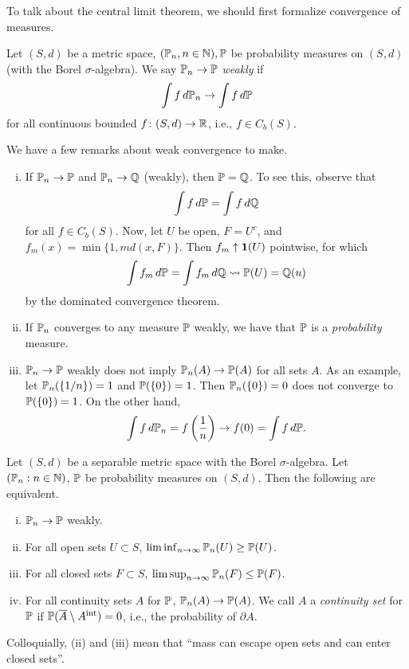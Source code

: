 To talk about the central limit theorem, we should first formalize convergence of measures.

\begin{definition} \label{defn:weak_measure_convergence}
    Let $(S, d)$ be a metric space, $(\mathbb P_n, n \in \mathbb N), \mathbb P$ be probability measures on $(S, d)$ (with the Borel $\sigma$-algebra). We say $\mathbb P_n \to \mathbb P$ \textit{weakly} if
    \[ \int f \, d \mathbb P_n \to \int f \, d\mathbb P \]
    for all continuous bounded $f \colon (S, d) \to \mathbb R$, i.e., $f \in C_b(S)$.
\end{definition}

We have a few remarks about weak convergence to make.
\begin{enumerate}[(i)]
    \item If $\mathbb P_n \to \mathbb P$ and $\mathbb P_n \to \mathbb Q$ (weakly), then $\mathbb P = \mathbb Q$. To see this, observe that
    \[ \int f \, d\mathbb P = \int f \, d\mathbb Q \]
    for all $f \in C_b(S)$. Now, let $U$ be open, $F = U^c$, and $f_m(x) = \min\{1, m d(x, F)\}$. Then $f_m \uparrow \mathbf 1(U)$ pointwise, for which
    \[ \int f_m \, d\mathbb P = \int f_m \, d\mathbb Q \leadsto \mathbb P(U) = \mathbb Q(u) \]
    by the dominated convergence theorem.

    \item If $\mathbb P_n$ converges to any measure $\mathbb P$ weakly, we have that $\mathbb P$ is a \textit{probability} measure. 
    
    \item $\mathbb P_n \to \mathbb P$ weakly does not imply $\mathbb P_n(A) \to \mathbb P(A)$ for all sets $A$. As an example, let $\mathbb P_n(\{1/n\}) = 1$ and $\mathbb P(\{0\}) = 1$. Then $\mathbb P_n(\{0\}) = 0$ does not converge to $\mathbb P(\{0\}) = 1$. On the other hand,
    \[ \int f \, d \mathbb P_n = f\left(\frac{1}{n}\right) \to f(0) = \int f \, d\mathbb P. \]
\end{enumerate}

\newpage
\begin{theorem} \label{thm:portmanteau}
    Let $(S, d)$ be a separable metric space with the Borel $\sigma$-algebra. Let $(\mathbb P_n : n \in \mathbb N)$, $\mathbb P$ be probability measures on $(S, d)$. Then the following are equivalent.
    \begin{enumerate}[(i)]
        \item $\mathbb P_n \to \mathbb P$ weakly.
        \item For all open sets $U \subset S$, $\liminf_{n \to \infty} \mathbb P_n(U) \geq \mathbb P(U)$.
        \item For all closed sets $F \subset S$, $\limsup_{n \to \infty} \mathbb P_n(F) \leq \mathbb P(F)$.
        \item For all continuity sets $A$ for $\mathbb P$, $\mathbb P_n(A) \to \mathbb P(A)$. We call $A$ a \textit{continuity set} for $\mathbb P$ if $\mathbb P(\overline A \setminus A^{\text{int}}) = 0$, i.e., the probability of $\partial A$.
    \end{enumerate}
\end{theorem}
Colloquially, (ii) and (iii) mean that ``mass can escape open sets and can enter closed sets''.

